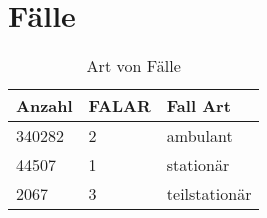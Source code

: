 \section{Fälle}
\begin{center}
 \begin{longtable}{|p{2.3cm}|p{2cm}|p{2.5cm}|}
  \caption{Art von Fälle} \\
  \hline

\rowcolor{lightgray} Anzahl & FALAR & Fall Art \\ \hline
\endhead
340282 & 2 & ambulant \\ \hline
44507 & 1 & stationär \\ \hline
2067 & 3 & teilstationär \\ \hline
\end{longtable}
\end{center}
